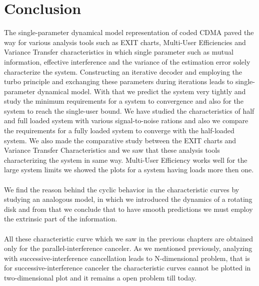 \chapter{Conclusion}
The single-parameter dynamical model representation of coded CDMA paved the way for various analysis tools such as EXIT charts, Multi-User Efficiencies and Variance Transfer characteristics in which single parameter such as mutual information, effective interference and the variance of the estimation error solely characterize the system. Constructing an iterative decoder and employing the turbo principle and exchanging these parameters during iterations leads to single-parameter dynamical model. With that we predict the system very tightly and study the minimum requirements for a system to convergence and also for the system to reach the single-user bound. We have studied the characteristics of half and full loaded system with various signal-to-noise rations and also we compare the requirements for a fully loaded system to converge with the half-loaded system. We also made the comparative study between the EXIT charts and Variance Transfer Characteristics and we saw that these analysis tools characterizing the system in same way. Multi-User Efficiency works well for the large system limits we showed the plots for a system having loads more then one.\\ \\
We find the reason behind the cyclic behavior in the characteristic curves by studying an analogous model, in which we introduced the dynamics of a rotating disk and from that we conclude that to have smooth predictions we must employ the extrinsic part of the information. \\ \\
All these characteristic curve which we saw in the previous chapters are obtained only for the parallel-interference canceler. As we mentioned previously, analyzing with successive-interference cancellation leads to N-dimensional problem, that is for successive-interference canceler the characteristic curves cannot be plotted in two-dimensional plot and it remains a open problem till today. \\ \\
